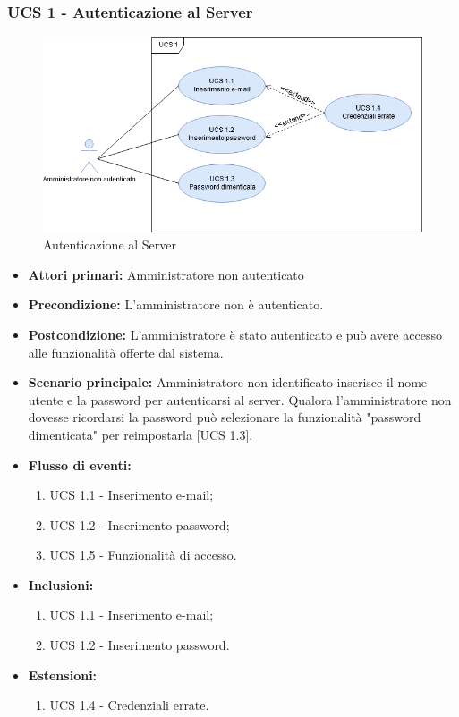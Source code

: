 \newpage

\subsubsection{UCS 1 - Autenticazione al Server}

\begin{figure}[h]
    \centering
    \includegraphics[scale=0.6]{sezioni/UseCase/Immagini/UCS1.png}
    \caption{Autenticazione al Server}
\end{figure}

\begin{itemize}
\item \textbf{Attori primari:} Amministratore non autenticato
\item \textbf{Precondizione:} L'amministratore non è autenticato.
\item \textbf{Postcondizione:} L'amministratore è stato autenticato e può avere accesso alle funzionalità offerte dal sistema.
\item \textbf{Scenario principale:} Amministratore non identificato inserisce il nome utente e la password per autenticarsi al server. Qualora l'amministratore non dovesse ricordarsi la password può selezionare la funzionalità "password dimenticata" per reimpostarla [UCS 1.3].
\item \textbf{Flusso di eventi:}
    \begin{enumerate}
        \item UCS 1.1 - Inserimento e-mail;
        \item UCS 1.2 - Inserimento password;
        \item UCS 1.5 - Funzionalità di accesso.
    \end{enumerate}
    \item \textbf{Inclusioni:}
	\begin{enumerate}		
		\item UCS 1.1 - Inserimento e-mail;
		\item UCS 1.2 - Inserimento password.
	\end{enumerate}
    \item \textbf{Estensioni:}
    \begin{enumerate}
		\item UCS 1.4 - Credenziali errate.
	\end{enumerate}
\end{itemize}

